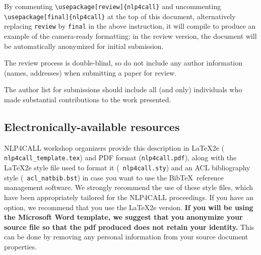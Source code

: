 \documentclass[11pt]{article}
\begin{document}
By commenting {\small\verb|\usepackage[review]{nlp4call}|} and uncommenting {\small\verb|\usepackage[final]{nlp4call}|} at the top of this 
 document, alternatively replacing {\small\verb|review|} by {\small\verb|final|} in the above instruction, it will compile to produce an example of the camera-ready formatting; in the review version, the document will be automatically anonymized for initial submission.  %

The review process is double-blind, so do not include any author information (names, addresses) when submitting a paper for review.  

The author list for submissions should include all (and only) individuals who made substantial contributions to the work presented. 

\subsection{Electronically-available resources}

NLP4CALL workshop organizers provide this description in \LaTeX2e ({\small {\tt
    nlp4call\_template.tex}}) and PDF format ({\small {\tt nlp4call.pdf}}),
along with the \LaTeX2e style file used to format it ({\small {\tt
    nlp4call.sty}}) and an ACL bibliography style ({\small {\tt
    acl\_natbib.bst}}) in case you want to use the Bib\TeX\ reference management
software. %
We strongly
recommend the use of these style files, which have been appropriately
tailored for the NLP4CALL proceedings. If you have an option, we
recommend that you use the \LaTeX2e version. \textbf{If you will be
  using the Microsoft Word template, we suggest that you anonymize
  your source file so that the pdf produced does not retain your
  identity.}  This can be done by removing any personal information
from your source document properties.
\end{document}
